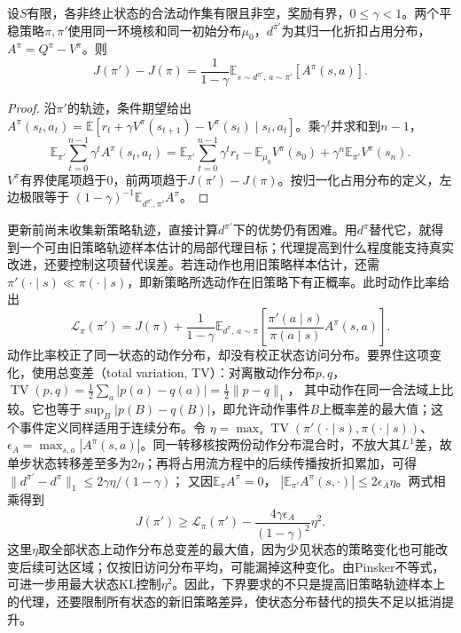 \begin{theorem}[折扣性能差恒等式]
  \label{thm:rl-learning-performance-difference}
  设$S$有限，各非终止状态的合法动作集有限且非空，奖励有界，$0\leq\gamma<1$。两个平稳策略$\pi,\pi'$使用同一环境核和同一初始分布$\mu_0$，$d^{\pi'}$为其归一化折扣占用分布，$A^\pi=Q^\pi-V^\pi$。则
  \begin{equation}
    J(\pi')-J(\pi)
       =\frac{1}{1-\gamma}
          \mathbb E_{s\sim d^{\pi'},\,a\sim\pi'}[A^\pi(s,a)].
    \label{eq:rl-learning-performance-difference}
  \end{equation}
\end{theorem}
\begin{proof}
  沿$\pi'$的轨迹，条件期望给出
  $A^\pi(s_t,a_t)
    =\mathbb E[r_t+\gamma V^\pi(s_{t+1})-V^\pi(s_t)
                \mid s_t,a_t]$。乘$\gamma^t$并求和到$n-1$，
  \[
    \mathbb E_{\pi'}\sum_{t=0}^{n-1}\gamma^t A^\pi(s_t,a_t)
      =\mathbb E_{\pi'}\sum_{t=0}^{n-1}\gamma^t r_t
         -\mathbb E_{\mu_0}V^\pi(s_0)
         +\gamma^n\mathbb E_{\pi'}V^\pi(s_n).
  \]
  $V^\pi$有界使尾项趋于0，前两项趋于$J(\pi')-J(\pi)$。按归一化占用分布的定义，左边极限等于
  $(1-\gamma)^{-1}\mathbb E_{d^{\pi'},\pi'}A^\pi$。
\end{proof}

更新前尚未收集新策略轨迹，直接计算$d^{\pi'}$下的优势仍有困难。用$d^\pi$替代它，就得到一个可由旧策略轨迹样本估计的局部代理目标；代理提高到什么程度能支持真实改进，还要控制这项替代误差。若连动作也用旧策略样本估计，还需$\pi'(\cdot\mid s)\ll\pi(\cdot\mid s)$，即新策略所选动作在旧策略下有正概率。此时动作比率给出
\[
  \mathcal L_\pi(\pi')
    =J(\pi)+\frac1{1-\gamma}
         \mathbb E_{d^\pi,\,a\sim\pi}
           \left[\frac{\pi'(a\mid s)}{\pi(a\mid s)}
                         A^\pi(s,a)\right].
\]
动作比率校正了同一状态的动作分布，却没有校正状态访问分布。要界住这项变化，使用总变差（total variation, TV）：对离散动作分布$p,q$，
$\operatorname{TV}(p,q)=\tfrac12\sum_a|p(a)-q(a)|
=\tfrac12\lVert p-q\rVert_1$，
其中动作在同一合法域上比较。它也等于$\sup_B|p(B)-q(B)|$，即允许动作事件$B$上概率差的最大值；这个事件定义同样适用于连续分布。令
$\eta=\max_s\operatorname{TV}(\pi'(\cdot\mid s),\pi(\cdot\mid s))$、
$\epsilon_A=\max_{s,a}|A^\pi(s,a)|$。同一转移核按两份动作分布混合时，不放大其$L^1$差，故单步状态转移差至多为$2\eta$；再将占用流方程中的后续传播按折扣累加，可得
$\lVert d^{\pi'}-d^\pi\rVert_1\leq2\gamma\eta/(1-\gamma)$；
又因$\mathbb E_\pi A^\pi=0$，
$|\mathbb E_{\pi'}A^\pi(s,\cdot)|\leq2\epsilon_A\eta$。两式相乘得到
\begin{equation}
  J(\pi')\geq\mathcal L_\pi(\pi')
       -\frac{4\gamma\epsilon_A}{(1-\gamma)^2}\eta^2 .
  \label{eq:rl-learning-trpo-bound}
\end{equation}
这里$\eta$取全部状态上动作分布总变差的最大值，因为少见状态的策略变化也可能改变后续可达区域；仅按旧访问分布平均，可能漏掉这种变化。由Pinsker不等式，可进一步用最大状态KL控制$\eta^2$。因此，下界要求的不只是提高旧策略轨迹样本上的代理，还要限制所有状态的新旧策略差异，使状态分布替代的损失不足以抵消提升。

